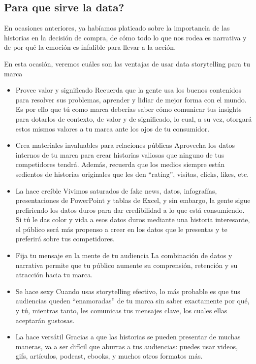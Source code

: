 \documentclass[preprint,12pt]{elsarticle}
\begin{document}
\subsection{Para que sirve la data?}

	En ocasiones anteriores, ya habíamos platicado sobre la importancia de las historias en la decisión de compra, de cómo todo lo que nos rodea es narrativa y de por qué la emoción es infalible para llevar a la acción.

En esta ocasión, veremos cuáles son las ventajas de usar data storytelling para tu marca
	\begin{itemize}
		\item Provee valor y significado
Recuerda que la gente usa los buenos contenidos para resolver sus problemas, aprender y lidiar de mejor forma con el mundo. Es por ello que tú como marca deberías saber cómo comunicar tus insights para dotarlos de contexto, de valor y de significado, lo cual, a su vez, otorgará estos mismos valores a tu marca ante los ojos de tu consumidor.

		\item Crea materiales invaluables para relaciones públicas
Aprovecha los datos internos de tu marca para crear historias valiosas que ninguno de tus competidores tendrá. Además, recuerda que los medios siempre están sedientos de historias originales que les den “rating”, visitas, clicks, likes, etc.

		\item La hace creíble
Vivimos saturados de fake news, datos, infografías, presentaciones de PowerPoint y tablas de Excel, y sin embargo, la gente sigue prefiriendo los datos duros para dar credibilidad a lo que está consumiendo. Si tú le das color y vida a esos datos duros mediante una historia interesante, el público será más propenso a creer en los datos que le presentas y te preferirá sobre tus competidores.

		\item Fija tu mensaje en la mente de tu audiencia
La combinación de datos y narrativa permite que tu público aumente su comprensión, retención y su atracción hacia tu marca.

		\item Se hace sexy
Cuando usas storytelling efectivo, lo más probable es que tus audiencias queden “enamoradas” de tu marca sin saber exactamente por qué, y tú, mientras tanto, les comunicas tus mensajes clave, los cuales ellas aceptarán gustosas.

		\item La hace versátil
Gracias a que las historias se pueden presentar de muchas maneras, va a ser difícil que aburras a tus audiencias: puedes usar videos, gifs, artículos, podcast, ebooks, y muchos otros formatos más.
\end{itemize}
 
\end{document}
